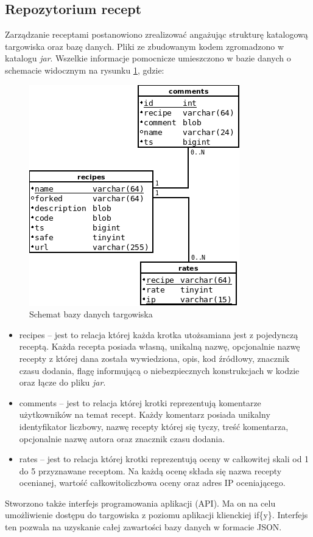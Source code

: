 \documentclass[11pt,a4paper,polish,thesis]{dcsbook}
\begin{document}
\subsection{Repozytorium recept}
Zarządzanie receptami postanowiono zrealizować angażując strukturę katalogową targowiska oraz bazę danych. Pliki ze zbudowanym kodem zgromadzono w katalogu \emph{jar}.
Wszelkie informacje pomocnicze umieszczono w bazie danych o schemacie widocznym na rysunku \ref{fig:market_db}, gdzie:
\begin{figure}[H]
  \centering
  \includegraphics[scale=0.7]{./resources/market_db.png}
  \caption{Schemat bazy danych targowiska}
  \label{fig:market_db}
\end{figure}
\begin{itemize}
\item recipes -- jest to relacja której każda krotka utożsamiana jest z pojedynczą receptą. Każda recepta posiada własną, unikalną nazwę, opcjonalnie nazwę recepty
z której dana została wywiedziona, opis, kod źródłowy, znacznik czasu dodania, flagę informującą o niebezpiecznych konstrukcjach w kodzie oraz łącze do pliku
\emph{jar}.
\item comments -- jest to relacja której krotki reprezentują komentarze użytkowników na temat recept. Każdy komentarz posiada unikalny identyfikator liczbowy, nazwę
recepty której się tyczy, treść komentarza, opcjonalnie nazwę autora oraz znacznik czasu dodania.
\item rates -- jest to relacja której krotki reprezentują oceny w całkowitej skali od 1 do 5 przyznawane receptom. Na każdą ocenę składa się nazwa recepty ocenianej,
wartość całkowitoliczbowa oceny oraz adres IP oceniającego.
\end{itemize}
Stworzono także interfejs programowania aplikacji (API). Ma on na celu umożliwienie dostępu do targowiska z poziomu aplikacji klienckiej if\{y\}. Interfejs ten
pozwala na uzyskanie całej zawartości bazy danych w formacie JSON.
\end{document}
